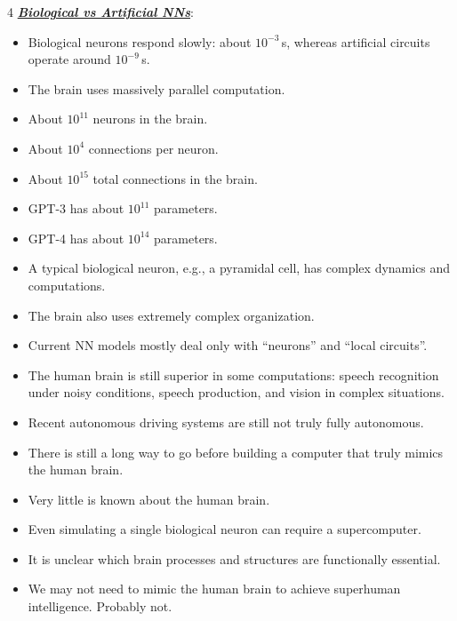 \documentclass[12pt]{article}
\newcommand{\bulletPoint}[1]{\ul{\textit{\textbf{#1}}}}
\begin{document}
\begin{multicols*}{4}
\bulletPoint{Biological vs Artificial NNs}:
\begin{itemize}
\item Biological neurons respond slowly: about $10^{-3}\,$s, whereas artificial circuits operate around $10^{-9}\,$s.
\item The brain uses massively parallel computation.
\item About $10^{11}$ neurons in the brain.
\item About $10^4$ connections per neuron.
\item About $10^{15}$ total connections in the brain.
\item GPT-3 has about $10^{11}$ parameters.
\item GPT-4 has about $10^{14}$ parameters.
\item A typical biological neuron, e.g., a pyramidal cell, has complex dynamics and computations.
\item The brain also uses extremely complex organization.
\item Current NN models mostly deal only with ``neurons'' and ``local circuits''.
\item The human brain is still superior in some computations: speech recognition under noisy conditions, speech production, and vision in complex situations.
\item Recent autonomous driving systems are still not truly fully autonomous.
\item There is still a long way to go before building a computer that truly mimics the human brain.
\item Very little is known about the human brain.
\item Even simulating a single biological neuron can require a supercomputer.
\item It is unclear which brain processes and structures are functionally essential.
\item We may not need to mimic the human brain to achieve superhuman intelligence. Probably not.
\end{itemize}


\end{multicols*}
\end{document}
